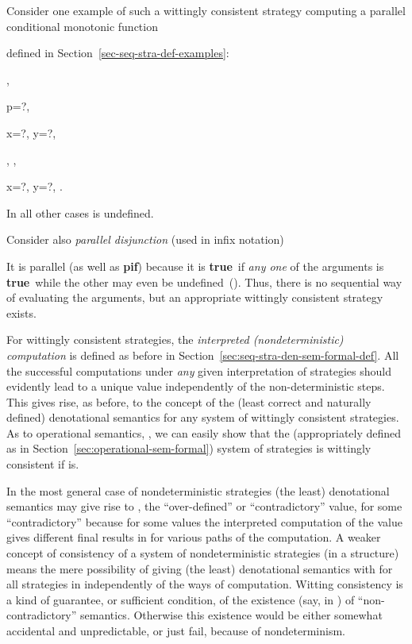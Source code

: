 \documentclass[fleqn]{LMCS}
\theoremstyle{plain}\newtheorem{satz}[thm]{Satz}
\theoremstyle{plain}\newtheorem{hyp}[thm]{Hypothesis}
\theoremstyle{plain}\newtheorem{hyps}[thm]{Hypotheses}
\theoremstyle{definition}\newtheorem{note}[thm]{Note}
\newcommand{\PIF}{\mbox{\bf pif}}
\newcommand{\?}{\mbox{?}}
\newcommand{\true}{\mbox{\bf true}}
\begin{document}
Consider one example of such a wittingly consistent 
strategy  computing 
a parallel conditional monotonic function 
 
defined in Section~\ref{sec-seq-stra-def-examples}: 

, 

p=\?,  

x=\?, 
y=\?, 

, 
, 

x=\?, 
y=\?, . 

\noindent
In all other cases  is undefined. 

Consider also 
\emph{parallel disjunction}  
(used in infix notation) 

It is parallel (as well as \PIF) because it is \true\ if 
\emph{any one} of the arguments is \true\ 
while the other may even be undefined~(). Thus, there is no 
sequential way of evaluating the arguments, but an appropriate 
wittingly consistent strategy exists. 


For wittingly consistent strategies, 
the \emph{interpreted (nondeterministic) computation} is defined as before 
in Section~\ref{sec:seq-stra-den-sem-formal-def}.  
All the successful computations under 
\emph{any} given interpretation of strategies  should 
evidently lead to a unique value  independently of 
the non-deterministic steps. This gives rise, as before, to 
the concept of the (least correct and naturally defined) denotational semantics 
 for any system of wittingly consistent strategies. 
As to operational semantics, , we can easily show 
that the (appropriately defined as in Section~\ref{sec:operational-sem-formal}) 
system of strategies 
 is wittingly consistent if 
 is.

In the most general case of nondeterministic strategies 
(the least) denotational semantics may give rise to , 
the ``over-defined'' or ``contradictory'' value,  
for some ``contradictory''  because for some 
values  the interpreted computation of the value 
gives different final results in  for various paths of the computation. 
A weaker concept of consistency \cite{Saz76SMZH,Saz76t} of a system of nondeterministic 
strategies (in a structure) means the mere possibility of giving 
(the least) denotational semantics with  
for all strategies in  independently of the ways of computation. 
Witting consistency is a kind of guarantee, or sufficient condition, of the 
existence (say, in ) of ``non-contradictory'' 
semantics. Otherwise this existence 
would be either somewhat accidental and unpredictable, 
or just fail, because of nondeterminism. 
\end{document}
